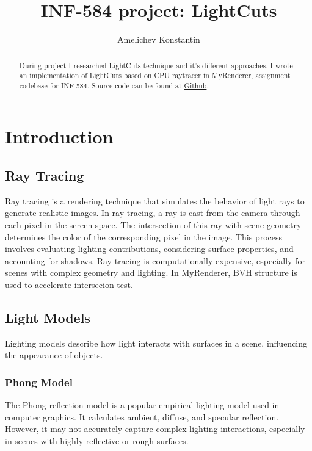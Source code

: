 \documentclass[twocolumn]{article}
\begin{document}
\title{INF-584 project: LightCuts}
\author{Amelichev Konstantin}
\maketitle

\begin{abstract}
    During project I researched LightCuts technique and it's different approaches.
    I wrote an implementation of LightCuts based on CPU raytracer in MyRenderer, assignment codebase for INF-584.
    Source code can be found at \href{https://github.com/KiK0S/my-lightcuts}{Github}.
\end{abstract}

\section{Introduction}
\label{sec:intro}
\subsection{Ray Tracing}

Ray tracing is a rendering technique that simulates the behavior of light rays to generate realistic images. In ray tracing, a ray is cast from the camera through each pixel in the screen space. The intersection of this ray with scene geometry determines the color of the corresponding pixel in the image. This process involves evaluating lighting contributions, considering surface properties, and accounting for shadows.
Ray tracing is computationally expensive, especially for scenes with complex geometry and lighting.
In MyRenderer, BVH structure is used to accelerate intersecion test.

\subsection{Light Models}
Lighting models describe how light interacts with surfaces in a scene, influencing the appearance of objects.

\subsubsection{Phong Model}
The Phong reflection model is a popular empirical lighting model used in computer graphics. It calculates ambient, diffuse, and specular reflection.
However, it may not accurately capture complex lighting interactions, especially in scenes with highly reflective or rough surfaces.
\end{document}
